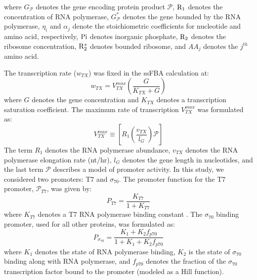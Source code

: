 \documentclass[journal=asbcd6,manuscript=article]{achemso}
\begin{document}
where $G_{\mathcal{P}}$ denotes the gene encoding protein product $\mathcal{P}$,
$\rm R_{1}$ denotes the concentration of RNA polymerase,
$G_{\mathcal{P}}^{*}$ denotes the gene bounded by the RNA polymerase,
$\eta_{i}$ and $ \alpha_{j}$ denote the stoichiometric coefficients for nucleotide and amino acid, respectively,
$\rm Pi$ denotes inorganic phosphate,
$\rm R_{2}$ denotes the ribosome concentration,
$\rm R_{2}^{*}$ denotes bounded ribosome,
and $AA_{j}$ denotes the $j^{th}$ amino acid.

The transcription rate ($w_{TX}$) was fixed in the ssFBA calculation at:
\begin{equation}
	w_{TX} = V_{TX}^{max}\left(\frac{G}{K_{TX}+G}\right)
\end{equation}
where $G$ denotes the gene concentration and $K_{TX}$ denotes a transcription saturation coefficient.
The maximum rate of transcription $V_{TX}^{max}$ was formulated as:
\begin{equation}
	V_{TX}^{max} \equiv \left[R_{1}\left(\frac{v_{TX}}{l_{G}}\right)\mathcal{P}\right]
\end{equation}
The term $R_{1}$ denotes the RNA polymerase abundance,
$v_{TX}$ denotes the RNA polymerase elongation rate (nt/hr),
$l_{G}$ denotes the gene length in nucleotides, and the last term $\mathcal{P}$ describes a model of promoter activity.
In this study, we considered two promoters: T7 and $\sigma_{70}$.
The promoter function for the T7 promoter, $\mathcal{P}_{T7}$, was given by:
\begin{equation}
	P_{T7} = \frac{K_{T7}}{1 + K_{T7}}
\end{equation}
where $K_{T7}$ denotes a T7 RNA polymerase binding constant \cite{Moon:2012aa}.
The $\sigma_{70}$ binding promoter, used for all other proteins, was formulated as:
\begin{equation}
	P_{\sigma_{70}} = \frac{K_{1}+K_{2}f_{p70}}{1 + K_{1}+K_{2}f_{p70}}
\end{equation}
where $K_{1}$ denotes the state of RNA polymerase binding,
$K_{2}$ is the state of $\sigma_{70}$ binding along with RNA polymerase, and $f_{p70}$ denotes the fraction of the $\sigma_{70}$ transcription factor bound to the promoter (modeled as a Hill function).
\end{document}
